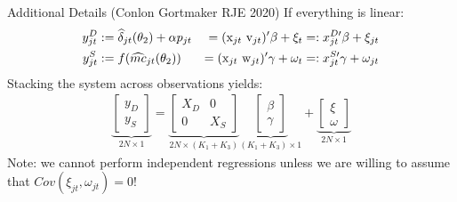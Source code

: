 \documentclass[aspectratio=169,11pt]{beamer}
\begin{document}
\begin{frame}{Additional Details (Conlon Gortmaker RJE 2020)}
If everything is linear:
\begin{alignat*}{3}
\label{eq:stacked}
\nonumber y_{jt}^D &:= \widehat \delta_{jt}(\theta_2) + \alpha p_{jt} &=(\textrm{x}_{jt} \-\ \textrm{v}_{jt})' \beta + \xi_t &=: x_{jt}^{D\prime}\beta + \xi_{jt} \\ 
y_{jt}^S &:= f(\widehat{mc}_{jt}(\theta_2)) &= (\textrm{x}_{jt} \-\ \textrm{w}_{jt})'\gamma + \omega_t &=: x_{jt}^{S\prime} \gamma + \omega_{jt} 
\end{alignat*}
Stacking the system across observations yields:
\begin{align*}
\underbrace{\begin{bmatrix} y_D \\ y_S \end{bmatrix}}_{2N\times1} = 
\underbrace{\begin{bmatrix}
X_D & 0 \\
0 & X_S 
\end{bmatrix}}_{2N\times(K_1+K_3)}
\underbrace{\begin{bmatrix}
\beta \\ \gamma %
\end{bmatrix}}_{(K_1+K_3)\times1} + 
\underbrace{\begin{bmatrix}
\xi \\ \omega %
\end{bmatrix}}_{2N\times 1}
\end{align*}
Note: we cannot perform independent regressions unless we are willing to assume that $Cov(\xi_{jt},\omega_{jt})=0$!
\end{frame}
\end{document}
